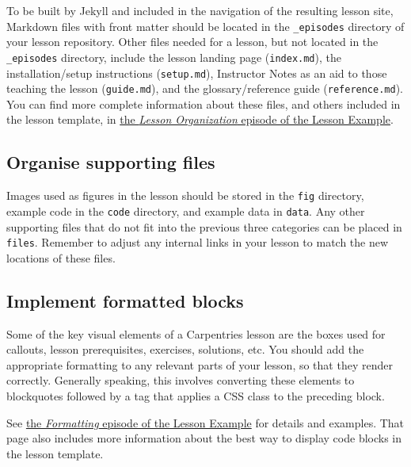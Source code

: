 \documentclass[
]{book}
\begin{document}
To be built by Jekyll and included in the navigation of the resulting lesson site,
Markdown files with front matter should be located in the \texttt{\_episodes} directory of
your lesson repository.
Other files needed for a lesson, but not located in the \texttt{\_episodes} directory,
include the lesson landing page (\texttt{index.md}),
the installation/setup instructions (\texttt{setup.md}),
Instructor Notes as an aid to those teaching the lesson (\texttt{guide.md}),
and the glossary/reference guide (\texttt{reference.md}).
You can find more complete information about these files, and others included in
the lesson template, in \href{https://carpentries.github.io/lesson-example/03-organization/index.html\#starter-files}{the \emph{Lesson Organization} episode of the Lesson Example}.

\hypertarget{organise-supporting-files}{%
\subsection{Organise supporting files}\label{organise-supporting-files}}

Images used as figures in the lesson should be stored in the \texttt{fig} directory,
example code in the \texttt{code} directory,
and example data in \texttt{data}.
Any other supporting files that do not fit into the previous three categories
can be placed in \texttt{files}.
Remember to adjust any internal links in your lesson to match the new locations
of these files.

\hypertarget{implement-formatted-blocks}{%
\subsection{Implement formatted blocks}\label{implement-formatted-blocks}}

Some of the key visual elements of a Carpentries lesson are the
boxes used for callouts, lesson prerequisites, exercises, solutions, etc.
You should add the appropriate formatting to any relevant parts of your
lesson, so that they render correctly.
Generally speaking, this involves converting these elements to blockquotes
followed by a tag that applies a CSS class to the preceding block.

See \href{https://carpentries.github.io/lesson-example/04-formatting/index.html\#special-blockquotes}{the \emph{Formatting} episode of the Lesson Example}
for details and examples.
That page also includes more information about the best way to display
code blocks in the lesson template.
\end{document}
